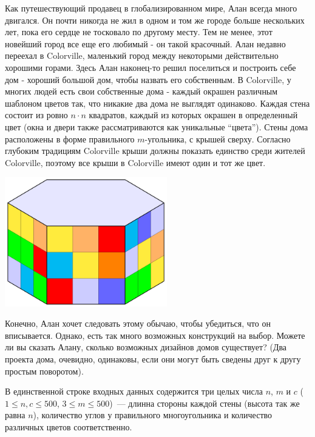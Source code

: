 
\Legend
Как путешествующий продавец в глобализированном мире, Алан всегда много двигался. Он почти никогда
не жил в одном и том же городе больше нескольких лет, пока его сердце не тосковало по другому месту.
Тем не менее, этот новейший город все еще его любимый - он такой красочный. Алан недавно переехал
в Colorville, маленький город между некоторыми действительно хорошими горами. Здесь Алан наконец-то
решил поселиться и построить себе дом - хороший большой дом, чтобы назвать его собственным.
В Colorville, у многих людей есть свои собственные дома - каждый окрашен различным шаблоном цветов
так, что никакие два дома не выглядят одинаково. Каждая стена состоит из ровно $n \cdot n$ квадратов,
каждый из которых окрашен в определенный цвет (окна и двери также рассматриваются как уникальные
``цвета''). Стены дома расположены в форме правильного $m$-угольника, с крышей сверху. Согласно
глубоким традициям Colorville крыши должны показать единство среди жителей Colorville, поэтому все
крыши в Colorville имеют один и тот же цвет.

\begin{center}
	\includegraphics[width=200pt,natwidth=680,natheight=544]{tasks/buildings/statements/images/building.png}
\end{center}

Конечно, Алан хочет следовать этому обычаю, чтобы убедиться, что он вписывается. Однако, есть
так много возможных конструкций на выбор. Можете ли вы сказать Алану, сколько возможных дизайнов
домов существует? (Два проекта дома, очевидно, одинаковы, если они могут быть сведены друг к другу
простым поворотом).

\Input
В единственной строке входных данных содержится три целых числа $n$, $m$ и $c$ ($1 \le n, c \le 500$,
$3 \le m \le 500$)~--- длинна стороны каждой стены (высота так же равна $n$), количество углов у
правильного многоугольника и количество различных цветов соответственно.

